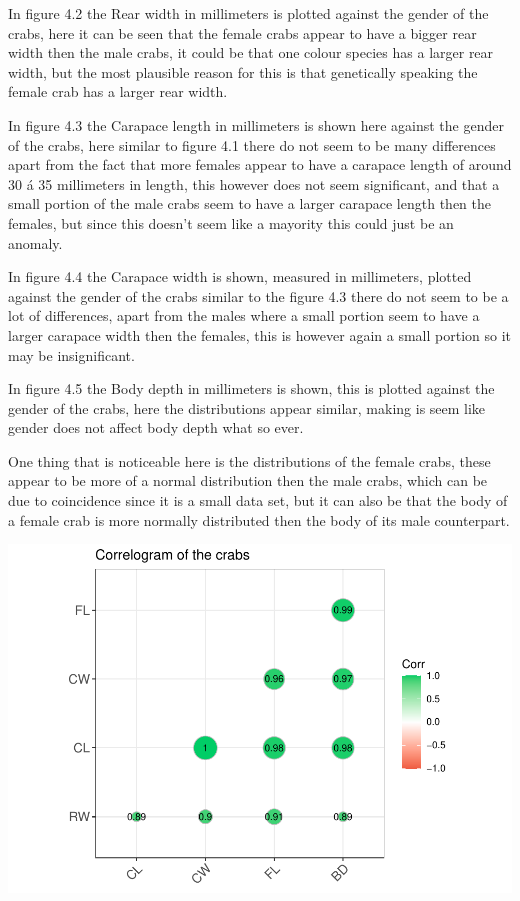 \documentclass[
]{article}
\begin{document}
In figure 4.2 the Rear width in millimeters is plotted against the
gender of the crabs, here it can be seen that the female crabs appear to
have a bigger rear width then the male crabs, it could be that one
colour species has a larger rear width, but the most plausible reason
for this is that genetically speaking the female crab has a larger rear
width.

In figure 4.3 the Carapace length in millimeters is shown here against
the gender of the crabs, here similar to figure 4.1 there do not seem to
be many differences apart from the fact that more females appear to have
a carapace length of around 30 á 35 millimeters in length, this however
does not seem significant, and that a small portion of the male crabs
seem to have a larger carapace length then the females, but since this
doesn't seem like a mayority this could just be an anomaly.

In figure 4.4 the Carapace width is shown, measured in millimeters,
plotted against the gender of the crabs similar to the figure 4.3 there
do not seem to be a lot of differences, apart from the males where a
small portion seem to have a larger carapace width then the females,
this is however again a small portion so it may be insignificant.

In figure 4.5 the Body depth in millimeters is shown, this is plotted
against the gender of the crabs, here the distributions appear similar,
making is seem like gender does not affect body depth what so ever.

One thing that is noticeable here is the distributions of the female
crabs, these appear to be more of a normal distribution then the male
crabs, which can be due to coincidence since it is a small data set, but
it can also be that the body of a female crab is more normally
distributed then the body of its male counterpart.

\begin{center}\includegraphics{CrabProject_files/figure-latex/unnamed-chunk-1-1} \end{center}
\end{document}
